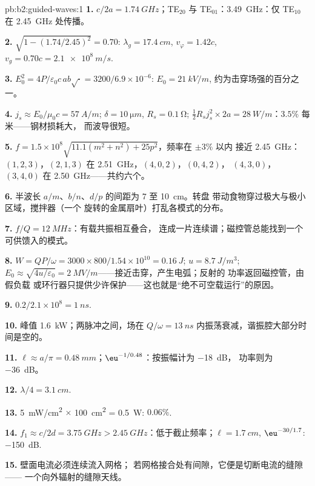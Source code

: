 \begin{solution}{pb:b2:guided-waves:1}
\textbf{1.} $c/2a = \qty{1.74}{GHz}$；TE$_{20}$ 与 TE$_{01}$：\qty{3.49}{GHz}：仅
TE$_{10}$ 在 \qty{2.45}{GHz} 处传播。

\textbf{2.} $\sqrt{1 - (1.74/2.45)^2} = 0.70$: $\lambda_g = \qty{17.4}{cm}$, $v_\varphi = 1.42c$,
$v_g = 0.70c = \qty{2.1e8}{m/s}$.

\textbf{3.} $E_0^2 = 4P/\varepsilon_0c\,ab\sqrt{\cdot} = 3200/6.9 \times 10^{-6}$: $E_0 = \qty{21}{kV/m}$,
约为击穿场强的百分之一。

\textbf{4.} $j_s \approx E_0/\mu_0c = \qty{57}{A/m}$; $\delta = \qty{10}{\micro m}$, $R_s = \qty{0.1}{\ohm}$;
$\tfrac12R_sj_s^2 \times 2a = \qty{28}{W/m}$：$3.5\%$ 每米——钢材损耗大，
而波导很短。

\textbf{5.} $f = 1.5 \times 10^8\sqrt{11.1(m^2 + n^2) + 25p^2}$，频率在 $\pm3\%$ 以内
接近 \qty{2.45}{GHz}：$(1, 2, 3)$，$(2, 1, 3)$ 在 \qty{2.51}{GHz}，$(4, 0, 2)$，$(0, 4, 2)$，
$(4, 3, 0)$，$(3, 4, 0)$ 在 \qty{2.50}{GHz}——共约六个。

\textbf{6.} 半波长 $a/m$、$b/n$、$d/p$ 的间距为 $7$ 至 \qty{10}{cm}。转盘
带动食物穿过极大与极小区域，搅拌器（一个
旋转的金属扇叶）打乱各模式的分布。

\textbf{7.} $f/Q = \qty{12}{MHz}$：有载共振相互叠合，
连成一片连续谱；磁控管总能找到一个可供馈入的模式。

\textbf{8.} $W = QP/\omega = 3000 \times 800/1.54 \times 10^{10} = \qty{0.16}{J}$; $u = \qty{8.7}{J/m^3}$;
$E_0 \approx \sqrt{4u/\varepsilon_0} = \qty{2}{MV/m}$——接近击穿，产生电弧；反射的
功率返回磁控管，由假负载
或环行器只提供少许保护——这也就是“绝不可空载运行”的原因。

\textbf{9.} $0.2/2.1 \times 10^8 = \qty{1}{ns}$.

\textbf{10.} 峰值 \qty{1.6}{kW}；两脉冲之间，场在
$Q/\omega = \qty{13}{ns}$ 内振荡衰减，谐振腔大部分时间是空的。

\textbf{11.} $\ell \approx a/\pi = \qty{0.48}{mm}$；$\eu^{-1/0.48}$：按振幅计为 \qty{-18}{dB}，
功率则为 \qty{-36}{dB}。

\textbf{12.} $\lambda/4 = \qty{3.1}{cm}$.

\textbf{13.} \qty{5}{mW/cm^2} $\times$ \qty{100}{cm^2} = \qty{0.5}{W}: $0.06\%$.

\textbf{14.} $f_1 \approx c/2d = \qty{3.75}{GHz} > \qty{2.45}{GHz}$：低于截止频率；$\ell =
\qty{1.7}{cm}$, $\eu^{-30/1.7}$: \qty{-150}{dB}.

\textbf{15.} 壁面电流必须连续流入网格；
若网格接合处有间隙，它便是切断电流的缝隙——
一个向外辐射的缝隙天线。


\end{solution}
